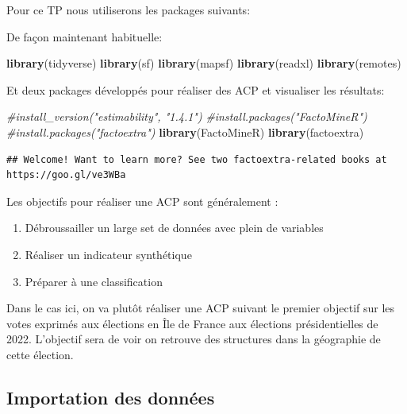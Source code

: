 \documentclass[
]{book}
\newenvironment{Shaded}{\begin{snugshade}}{\end{snugshade}}
\newcommand{\CommentTok}[1]{\textcolor[rgb]{0.56,0.35,0.01}{\textit{#1}}}
\newcommand{\FunctionTok}[1]{\textcolor[rgb]{0.13,0.29,0.53}{\textbf{#1}}}
\newcommand{\NormalTok}[1]{#1}
\begin{document}
Pour ce TP nous utiliserons les packages suivants:

De façon maintenant habituelle:

\begin{Shaded}
\begin{Highlighting}[]
\FunctionTok{library}\NormalTok{(tidyverse)}
\FunctionTok{library}\NormalTok{(sf)}
\FunctionTok{library}\NormalTok{(mapsf)}
\FunctionTok{library}\NormalTok{(readxl)}
\FunctionTok{library}\NormalTok{(remotes) }
\end{Highlighting}
\end{Shaded}

Et deux packages développés pour réaliser des ACP et visualiser les résultats:

\begin{Shaded}
\begin{Highlighting}[]
\CommentTok{\#install\_version("estimability", "1.4.1")}
\CommentTok{\#install.packages("FactoMineR") }
\CommentTok{\#install.packages("factoextra")}
\FunctionTok{library}\NormalTok{(FactoMineR)}
\FunctionTok{library}\NormalTok{(factoextra)}
\end{Highlighting}
\end{Shaded}

\begin{verbatim}
## Welcome! Want to learn more? See two factoextra-related books at https://goo.gl/ve3WBa
\end{verbatim}

Les objectifs pour réaliser une ACP sont généralement :

\begin{enumerate}
\def\labelenumi{\arabic{enumi}.}
\item
  Débroussailler un large set de données avec plein de variables
\item
  Réaliser un indicateur synthétique
\item
  Préparer à une classification
\end{enumerate}

Dans le cas ici, on va plutôt réaliser une ACP suivant le premier objectif sur les votes exprimés aux élections en Île de France aux élections présidentielles de 2022. L'objectif sera de voir on retrouve des structures dans la géographie de cette élection.

\hypertarget{importation-des-donnuxe9es}{%
\subsection{Importation des données}\label{importation-des-donnuxe9es}}
\end{document}
